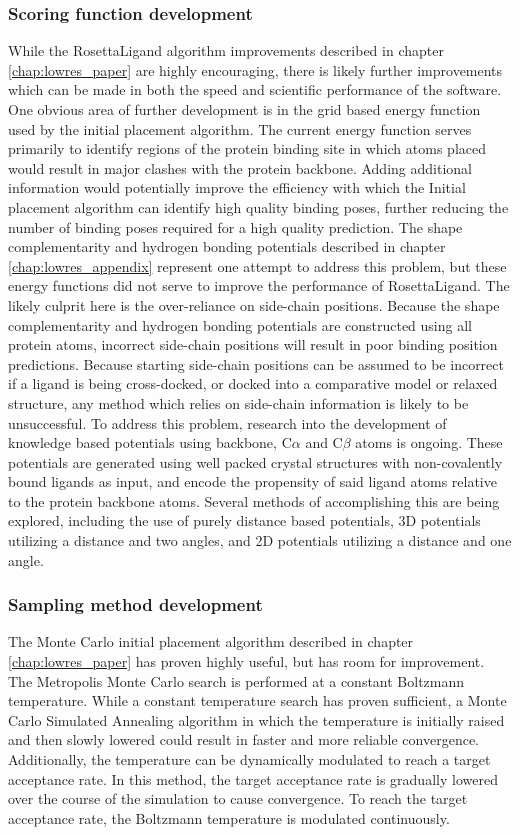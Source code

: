 \subsubsection{Scoring function development}
While the RosettaLigand algorithm improvements described in chapter \ref{chap:lowres_paper} are highly encouraging, there is likely further improvements which can be made in both the speed and scientific performance of the software.
One obvious area of further development is in the grid based energy function used by the initial placement algorithm.
The current energy function serves primarily to identify regions of the protein binding site in which atoms placed would result in major clashes with the protein backbone.  
Adding additional information would potentially improve the efficiency with which the Initial placement algorithm can identify high quality binding poses, further reducing the number of binding poses required for a high quality prediction.
The shape complementarity and hydrogen bonding potentials described in chapter \ref{chap:lowres_appendix} represent one attempt to address this problem, but these energy functions did not serve to improve the performance of RosettaLigand.
The likely culprit here is the over-reliance on side-chain positions.
Because the shape complementarity and hydrogen bonding potentials are constructed using all protein atoms, incorrect side-chain positions will result in poor binding position predictions.
Because starting side-chain positions can be assumed to be incorrect if a ligand is being cross-docked, or docked into a comparative model or relaxed structure, any method which relies on side-chain information is likely to be unsuccessful.
To address this problem, research into the development of knowledge based potentials using backbone, C$\alpha$ and C$\beta$ atoms is ongoing.
These potentials are generated using well packed crystal structures with non-covalently bound ligands as input, and encode the propensity of said ligand atoms relative to the protein backbone atoms.
Several methods of accomplishing this are being explored, including the use of purely distance based potentials, 3D potentials utilizing a distance and two angles, and 2D potentials utilizing a distance and one angle.

\subsubsection{Sampling method development}
The Monte Carlo initial placement algorithm described in chapter \ref{chap:lowres_paper} has proven highly useful, but has room for improvement.
The Metropolis Monte Carlo search is performed at a constant Boltzmann temperature.
While a constant temperature search has proven sufficient, a Monte Carlo Simulated Annealing algorithm in which the temperature is initially raised and then slowly lowered could result in faster and more reliable convergence. 
Additionally, the temperature can be dynamically modulated to reach a target acceptance rate.
In this method, the target acceptance rate is gradually lowered over the course of the simulation to cause convergence.
To reach the target acceptance rate, the Boltzmann temperature is modulated continuously.

